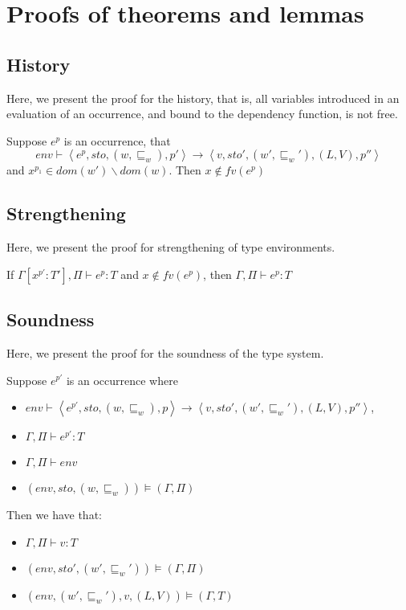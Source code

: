\documentclass[../../master.tex]{subfiles}
\begin{document}
\section{Proofs of theorems and lemmas}
\subsection{History}\label{app:HisProof}
Here, we present the proof for the history, that is, all variables introduced in an evaluation of an occurrence, and bound to the dependency function, is not free.

\begin{lemma}[History]
	Suppose $e^p$ is an occurrence, that
	$$env\vdash\left\langle e^{p},sto,(w,\sqsubseteq_w),p'\right\rangle\rightarrow\left\langle v,sto',(w',\sqsubseteq_w'),(L,V),p''\right\rangle$$
		and $x^{p_1}\in dom(w')\backslash dom(w)$.
		Then $x\notin fv(e^{p})$
\end{lemma}


\subsection{Strengthening}\label{app:StrProof}
Here, we present the proof for strengthening of type environments.

\begin{lemma}[Strengthening]
	If $\Gamma[x^{p'}:T'],\Pi\vdash e^{p}:T$ and $x\notin fv(e^p)$, then $\Gamma,\Pi\vdash e^{p}:T$
\end{lemma}


\subsection{Soundness}\label{app:SoundnessProof}
Here, we present the proof for the soundness of the type system.

\begin{theorem}
	Suppose $e^{p'}$ is an occurrence where
	\begin{itemize}
		\item $env\vdash\left\langle e^{p'},sto,(w,\sqsubseteq_w),p\right\rangle\rightarrow\left\langle v,sto',(w',\sqsubseteq_w'),(L,V),p''\right\rangle$,
		\item $\Gamma,\Pi\vdash e^{p'} : T$
		\item $\Gamma,\Pi\vdash env$
		\item $(env,sto,(w,\sqsubseteq_w))\models(\Gamma,\Pi)$
	\end{itemize}
	Then we have that:
	\begin{itemize}
		\item $\Gamma,\Pi\vdash v:T$
		\item $(env,sto',(w',\sqsubseteq_w'))\models(\Gamma,\Pi)$
		\item $(env,(w',\sqsubseteq_w'),v,(L,V))\models(\Gamma,T)$
	\end{itemize}
\end{theorem}

\end{document}
